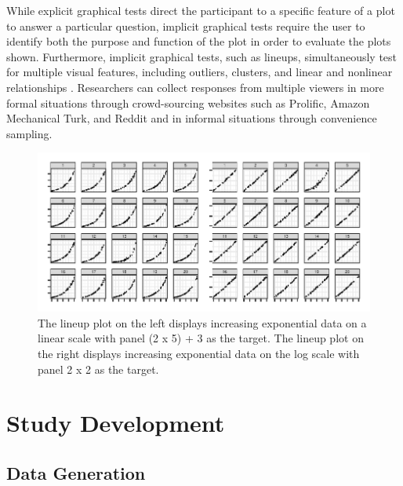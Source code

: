 \documentclass[12pt]{article}
\begin{document}
While explicit graphical tests direct the participant to a specific
feature of a plot to answer a particular question, implicit graphical
tests require the user to identify both the purpose and function of the
plot in order to evaluate the plots shown. Furthermore, implicit
graphical tests, such as lineups, simultaneously test for multiple
visual features, including outliers, clusters, and linear and nonlinear
relationships \citep{vanderplas_testing_2020}. Researchers can collect
responses from multiple viewers in more formal situations through
crowd-sourcing websites such as Prolific, Amazon Mechanical Turk, and
Reddit and in informal situations through convenience sampling.

\begin{figure}[tbp]

{\centering \includegraphics[width=\linewidth,]{logarithmic-lineups_files/figure-latex/lineup-example-1} 

}

\caption[Lineup examples]{The lineup plot on the left displays increasing exponential data on a linear scale with panel (2 x 5) + 3 as the target. The lineup plot on the right displays increasing exponential data on the log scale with panel 2 x 2 as the target.}\label{fig:lineup-example}
\end{figure}

\hypertarget{study-development}{%
\section{Study Development}\label{study-development}}

\hypertarget{data-generation}{%
\subsection{Data Generation}\label{data-generation}}
\end{document}
